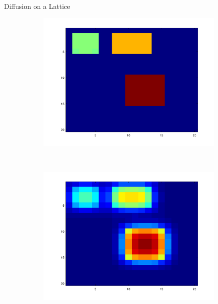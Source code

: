 \documentclass[10pt]{beamer}
\begin{document}
\begin{frame}{Diffusion on a Lattice}
	
	\begin{figure}[!h]
		\begin{subfigure}[b]{0.25\textwidth}
			\includegraphics[width=\textwidth]{images/anim_0.png}
		\end{subfigure}~
		\begin{subfigure}[b]{0.25\textwidth}
			\includegraphics[width= \textwidth]{images/anim_15.png}
		\end{subfigure}~
		\begin{subfigure}[b]{0.25\textwidth}

\end{subfigure}
\end{figure}
\end{frame}
\end{document}

